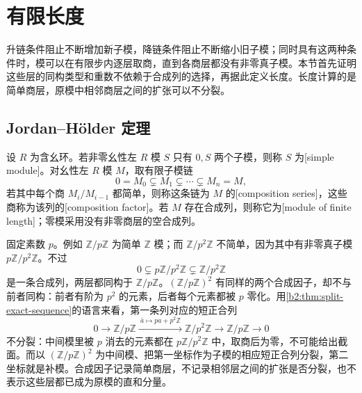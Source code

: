 
\section{有限长度}
\label{b2:sec:1202}

升链条件阻止不断增加新子模，降链条件阻止不断缩小旧子模；同时具有这两种条件时，模可以在有限步内逐层取商，直到各商层都没有非零真子模。本节首先证明这些层的同构类型和重数不依赖于合成列的选择，再据此定义长度。长度计算的是简单商层，原模中相邻商层之间的扩张可以不分裂。

%
%

\subsection{Jordan–Hölder 定理}
\label{b2:subsec:1202:01}

\begin{definition}\label{b2:def:composition-series}
	设 \(R\) 为含幺环。若非零幺性左 \(R\) 模 \(S\) 只有 \(0,S\) 两个子模，则称 \(S\) 为[simple module]。对幺性左 \(R\) 模 \(M\)，取有限子模链
	\[
		0=M_0\subsetneq M_1\subsetneq\cdots\subsetneq M_n=M,
	\]
	若其中每个商 \(M_i/M_{i-1}\) 都简单，则称这条链为 \(M\) 的[composition series]，这些商称为该列的[composition factor]。若 \(M\) 存在合成列，则称它为[module of finite length]；零模采用没有非零商层的空合成列。
\end{definition}

固定素数 \(p\)。例如 \(\mathbb Z/p\mathbb Z\) 为简单 \(\mathbb Z\) 模；而 \(\mathbb Z/p^2\mathbb Z\) 不简单，因为其中有非零真子模 \(p\mathbb Z/p^2\mathbb Z\)。不过
\[
	0\subsetneq p\mathbb Z/p^2\mathbb Z\subsetneq\mathbb Z/p^2\mathbb Z
\]
是一条合成列，两层都同构于 \(\mathbb Z/p\mathbb Z\)。\((\mathbb Z/p\mathbb Z)^2\) 有同样的两个合成因子，却不与前者同构：前者有阶为 \(p^2\) 的元素，后者每个元素都被 \(p\) 零化。用\cref{b2:thm:split-exact-sequence}的语言来看，第一条列对应的短正合列
\[
	0\longrightarrow\mathbb Z/p\mathbb Z \xrightarrow{\ \bar a\mapsto pa+p^2\mathbb Z\ } \mathbb Z/p^2\mathbb Z \longrightarrow\mathbb Z/p\mathbb Z\longrightarrow0
\]
不分裂：中间模里被 \(p\) 消去的元素都在 \(p\mathbb Z/p^2\mathbb Z\) 中，取商后为零，不可能给出截面。而以 \((\mathbb Z/p\mathbb Z)^2\) 为中间模、把第一坐标作为子模的相应短正合列分裂，第二坐标就是补模。合成因子记录简单商层，不记录相邻层之间的扩张是否分裂，也不表示这些层都已成为原模的直和分量。

